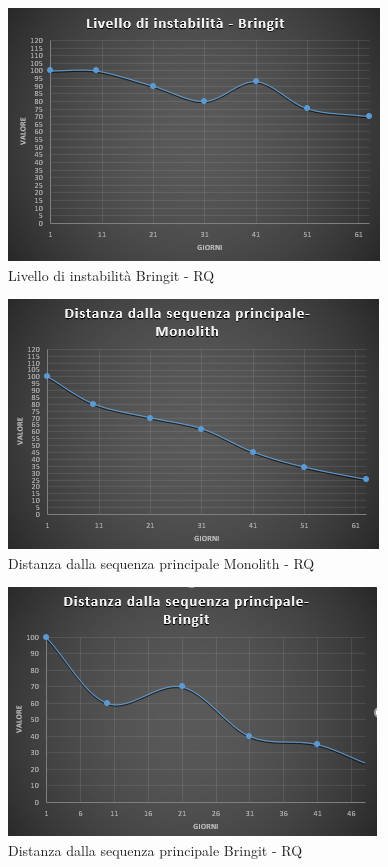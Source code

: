 \begin{figure}[H]
	\centering 
	\includegraphics[scale=0.85]{Sezioni/Immagini/LivelloInstabilitaApp-RQ}
	\caption{Livello di instabilità Bringit - RQ}
\end{figure}

\begin{figure}[H]
	\centering 
	\includegraphics[scale=0.85]{Sezioni/Immagini/DistanzaSDK-RQ}
	\caption{Distanza dalla sequenza principale Monolith - RQ}
\end{figure}

\begin{figure}[H]
	\centering 
	\includegraphics[scale=0.85]{Sezioni/Immagini/DistanzaApp-RQ}
	\caption{Distanza dalla sequenza principale Bringit - RQ}
\end{figure}

